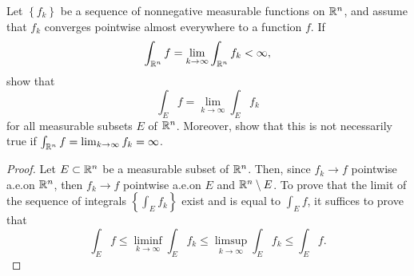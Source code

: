 \begin{problem}
Let $\left\{f_k\right\}$ be a sequence of nonnegative measurable functions
on $\mathbb{R}^n$, and assume that $f_k$ converges pointwise almost everywhere to
a function $f$. If
\[
\int_{\mathbb{R}^n} f=\lim_{k\to\infty}\int_{\mathbb{R}^n} f_k<\infty,
\]
show that
\[
\int_E f=\lim_{k\to\infty}\int_E f_k
\]
for all measurable subsets $E$ of $\mathbb{R}^n$. Moreover, show that this is not
necessarily true if $\int_{\mathbb{R}^n} f=\lim_{k\to\infty} f_k=\infty$.
\end{problem}
\begin{proof}
Let $E\subset\mathbb{R}^n$ be a measurable subset of $\mathbb{R}^n$. Then, since
$f_k\to f$ pointwise a.e.\@ on $\mathbb{R}^n$, then $f_k\to f$ pointwise a.e.\@ on
$E$ and $\mathbb{R}^n\setminus E$. To prove that the limit of the sequence
of integrals $\left\{\int_Ef_k\right\}$ exist and is equal to $\int_E f$,
it suffices to prove that
\begin{equation}
  \label{eq:prep:2:6}
\int_E
f\leq\liminf_{k\to\infty}\int_Ef_k\leq\limsup_{k\to\infty}\int_Ef_k\leq\int_E f.
\end{equation}


\end{proof}
